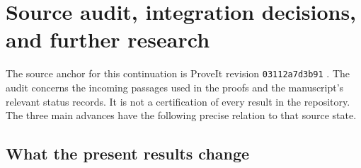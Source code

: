 \section{Source audit, integration decisions, and further research}
\label{status:section}

The source anchor for this continuation is ProveIt revision
\texttt{03112a7d3b91} \cite{ProveIt}.
The audit concerns the incoming passages used in the proofs and the
manuscript's relevant status records. It is not a certification of
every result in the repository. The three main advances have the
following precise relation to that source state.

\subsection{What the present results change}

